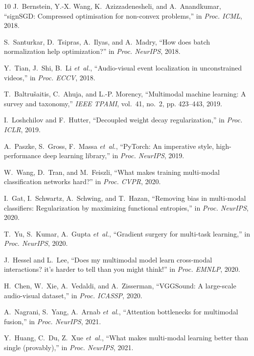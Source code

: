 \documentclass[conference]{IEEEtran}
\begin{document}
\begin{thebibliography}{10}
J.~Bernstein, Y.-X. Wang, K.~Azizzadenesheli, and A.~Anandkumar, ``sign{SGD}: Compressed optimisation for non-convex problems,'' in \emph{Proc. ICML}, 2018.

S.~Santurkar, D.~Tsipras, A.~Ilyas, and A.~Madry, ``How does batch normalization help optimization?'' in \emph{Proc. NeurIPS}, 2018.

Y.~Tian, J.~Shi, B.~Li \emph{et~al.}, ``Audio-visual event localization in unconstrained videos,'' in \emph{Proc. ECCV}, 2018.

T.~Baltru{\v{s}}aitis, C.~Ahuja, and L.-P. Morency, ``Multimodal machine learning: A survey and taxonomy,'' \emph{IEEE TPAMI}, vol.~41, no.~2, pp. 423--443, 2019.

I.~Loshchilov and F.~Hutter, ``Decoupled weight decay regularization,'' in \emph{Proc. ICLR}, 2019.

A.~Paszke, S.~Gross, F.~Massa \emph{et~al.}, ``{PyTorch}: An imperative style, high-performance deep learning library,'' in \emph{Proc. NeurIPS}, 2019.

W.~Wang, D.~Tran, and M.~Feiszli, ``What makes training multi-modal classification networks hard?'' in \emph{Proc. CVPR}, 2020.

I.~Gat, I.~Schwartz, A.~Schwing, and T.~Hazan, ``Removing bias in multi-modal classifiers: Regularization by maximizing functional entropies,'' in \emph{Proc. NeurIPS}, 2020.

T.~Yu, S.~Kumar, A.~Gupta \emph{et~al.}, ``Gradient surgery for multi-task learning,'' in \emph{Proc. NeurIPS}, 2020.

J.~Hessel and L.~Lee, ``Does my multimodal model learn cross-modal interactions? it's harder to tell than you might think!'' in \emph{Proc. EMNLP}, 2020.

H.~Chen, W.~Xie, A.~Vedaldi, and A.~Zisserman, ``{VGGSound}: A large-scale audio-visual dataset,'' in \emph{Proc. ICASSP}, 2020.

A.~Nagrani, S.~Yang, A.~Arnab \emph{et~al.}, ``Attention bottlenecks for multimodal fusion,'' in \emph{Proc. NeurIPS}, 2021.

Y.~Huang, C.~Du, Z.~Xue \emph{et~al.}, ``What makes multi-modal learning better than single (provably),'' in \emph{Proc. NeurIPS}, 2021.


\end{thebibliography}
\end{document}
